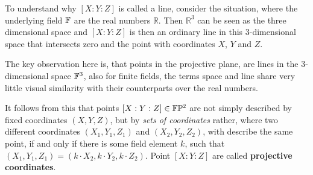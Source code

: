 To understand why $[X:Y:Z]$ is called a line, consider the situation, where the underlying field $\mathbb{F}$ are the real numbers $\mathbb{R}$. Then $\mathbb{R}^3$ can be seen as the three dimensional space and $[X:Y:Z]$ is then an ordinary line in this 3-dimensional space that intersects zero and the point with coordinates $X$, $Y$ and $Z$.

The key observation here is, that points in the projective plane, are lines in the $3$-dimensional space $\mathbb{F}^3$, also for finite fields, the terms space and line share very little visual similarity with their counterparts over the real numbers.

It follows from this that points $[X:Y:Z]\in \mathbb{F}\mathbb{P}^2$ are not simply described by fixed coordinates $(X,Y,Z)$, but by \textit{sets of coordinates} rather, where two different coordinates $(X_1,Y_1,Z_1)$ and $(X_2,Y_2,Z_2)$, with describe the same point, if and only if there is some field element $k$, such that $(X_1,Y_1,Z_1) = (k\cdot X_2,k\cdot Y_2,k\cdot Z_2)$. Point $[X:Y:Z]$ are called \textbf{projective coordinates}.

